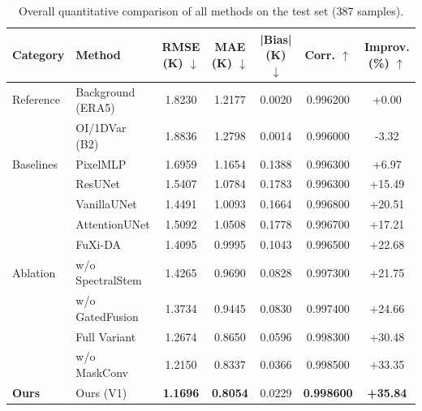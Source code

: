 \begin{table}[t]
\centering
\caption{Overall quantitative comparison of all methods on the test set (387 samples).}
\label{tab:main_results}
\begin{tabular}{llccccc}
\toprule
Category & Method & RMSE (K) $\downarrow$ & MAE (K) $\downarrow$ & |Bias| (K) $\downarrow$ & Corr. $\uparrow$ & Improv. (\%) $\uparrow$ \\
\midrule
  Reference & Background (ERA5) & 1.8230 & 1.2177 & 0.0020 & 0.996200 & +0.00 \\
   & OI/1DVar (B2) & 1.8836 & 1.2798 & 0.0014 & 0.996000 & -3.32 \\
\midrule
  Baselines & PixelMLP & 1.6959 & 1.1654 & 0.1388 & 0.996300 & +6.97 \\
   & ResUNet & 1.5407 & 1.0784 & 0.1783 & 0.996300 & +15.49 \\
   & VanillaUNet & 1.4491 & 1.0093 & 0.1664 & 0.996800 & +20.51 \\
   & AttentionUNet & 1.5092 & 1.0508 & 0.1778 & 0.996700 & +17.21 \\
   & FuXi-DA & 1.4095 & 0.9995 & 0.1043 & 0.996500 & +22.68 \\
\midrule
  Ablation & w/o SpectralStem & 1.4265 & 0.9690 & 0.0828 & 0.997300 & +21.75 \\
   & w/o GatedFusion & 1.3734 & 0.9445 & 0.0830 & 0.997400 & +24.66 \\
   & Full Variant & 1.2674 & 0.8650 & 0.0596 & 0.998300 & +30.48 \\
   & w/o MaskConv & 1.2150 & 0.8337 & 0.0366 & 0.998500 & +33.35 \\
\midrule
  \textbf{Ours} & Ours (V1) & \textbf{1.1696} & \textbf{0.8054} & 0.0229 & \textbf{0.998600} & \textbf{+35.84} \\
\bottomrule
\end{tabular}
\end{table}